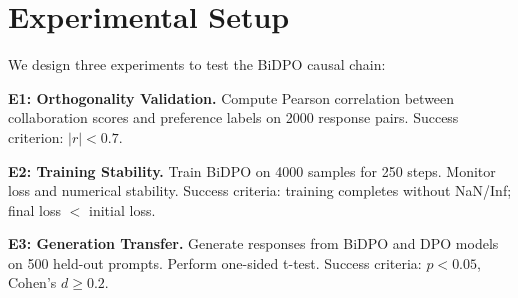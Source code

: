 \section{Experimental Setup}

We design three experiments to test the BiDPO causal chain:

\textbf{E1: Orthogonality Validation.} Compute Pearson correlation between collaboration scores and preference labels on 2000 response pairs. Success criterion: $|r| < 0.7$.

\textbf{E2: Training Stability.} Train BiDPO on 4000 samples for 250 steps. Monitor loss and numerical stability. Success criteria: training completes without NaN/Inf; final loss $<$ initial loss.

\textbf{E3: Generation Transfer.} Generate responses from BiDPO and DPO models on 500 held-out prompts. Perform one-sided t-test. Success criteria: $p < 0.05$, Cohen's $d \geq 0.2$.
